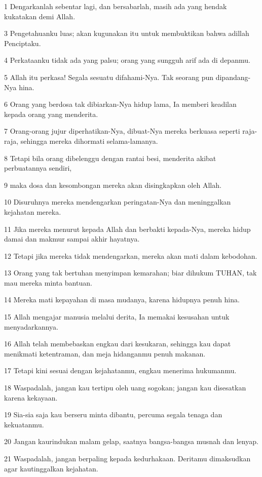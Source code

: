 \par 1 Dengarkanlah sebentar lagi, dan bersabarlah, masih ada yang hendak kukatakan demi Allah.
\par 3 Pengetahuanku luas; akan kugunakan itu untuk membuktikan bahwa adillah Penciptaku.
\par 4 Perkataanku tidak ada yang palsu; orang yang sungguh arif ada di depanmu.
\par 5 Allah itu perkasa! Segala sesuatu difahami-Nya. Tak seorang pun dipandang-Nya hina.
\par 6 Orang yang berdosa tak dibiarkan-Nya hidup lama, Ia memberi keadilan kepada orang yang menderita.
\par 7 Orang-orang jujur diperhatikan-Nya, dibuat-Nya mereka berkuasa seperti raja-raja, sehingga mereka dihormati selama-lamanya.
\par 8 Tetapi bila orang dibelenggu dengan rantai besi, menderita akibat perbuatannya sendiri,
\par 9 maka dosa dan kesombongan mereka akan disingkapkan oleh Allah.
\par 10 Disuruhnya mereka mendengarkan peringatan-Nya dan meninggalkan kejahatan mereka.
\par 11 Jika mereka menurut kepada Allah dan berbakti kepada-Nya, mereka hidup damai dan makmur sampai akhir hayatnya.
\par 12 Tetapi jika mereka tidak mendengarkan, mereka akan mati dalam kebodohan.
\par 13 Orang yang tak bertuhan menyimpan kemarahan; biar dihukum TUHAN, tak mau mereka minta bantuan.
\par 14 Mereka mati kepayahan di masa mudanya, karena hidupnya penuh hina.
\par 15 Allah mengajar manusia melalui derita, Ia memakai kesusahan untuk menyadarkannya.
\par 16 Allah telah membebaskan engkau dari kesukaran, sehingga kau dapat menikmati ketentraman, dan meja hidanganmu penuh makanan.
\par 17 Tetapi kini sesuai dengan kejahatanmu, engkau menerima hukumanmu.
\par 18 Waspadalah, jangan kau tertipu oleh uang sogokan; jangan kau disesatkan karena kekayaan.
\par 19 Sia-sia saja kau berseru minta dibantu, percuma segala tenaga dan kekuatanmu.
\par 20 Jangan kaurindukan malam gelap, saatnya bangsa-bangsa musnah dan lenyap.
\par 21 Waspadalah, jangan berpaling kepada kedurhakaan. Deritamu dimaksudkan agar kautinggalkan kejahatan.
